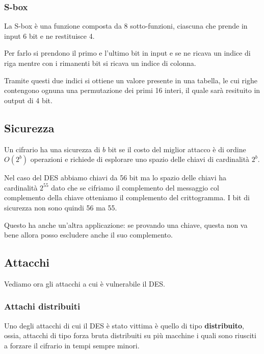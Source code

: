 \subsubsection{S-box}
La S-box \`e una funzione composta da 8 sotto-funzioni, ciascuna che prende in input 6 bit e ne restituisce 4.

Per farlo si prendono il primo e l'ultimo bit in input e se ne ricava un indice di riga mentre con i rimanenti bit
si ricava un indice di colonna.

Tramite questi due indici si ottiene un valore presente in una tabella, le cui righe contengono ognuna una permutazione
dei primi 16 interi, il quale sar\`a resituito in output di 4 bit.

\subsection{Sicurezza}\label{sicurezza_DES}
Un cifrario ha una sicurezza di $b$ bit se il costo del miglior attacco \`e di ordine $O(2^b)$ operazioni e richiede di
esplorare uno spazio delle chiavi di cardinalit\`a $2^b$.

Nel caso del DES abbiamo chiavi da 56 bit ma lo spazio delle chiavi ha cardinalit\`a $2^{55}$ dato che se cifriamo
il complemento del messaggio col complemento della chiave otteniamo il complemento del crittogramma. I bit di sicurezza
non sono quindi 56 ma 55.

Questo ha anche un'altra applicazione: se provando una chiave, questa non va bene allora posso escludere anche il suo
complemento.

\subsection{Attacchi}\label{attacchi_DES}
Vediamo ora gli attacchi a cui \`e vulnerabile il DES.

\subsubsection{Attachi distribuiti}
Uno degli attacchi di cui il DES \`e stato vittima \`e quello di tipo \textbf{distribuito}, ossia, attacchi di tipo
forza bruta distribuiti su pi\`u macchine i quali sono riusciti a forzare il cifrario in tempi sempre minori.

